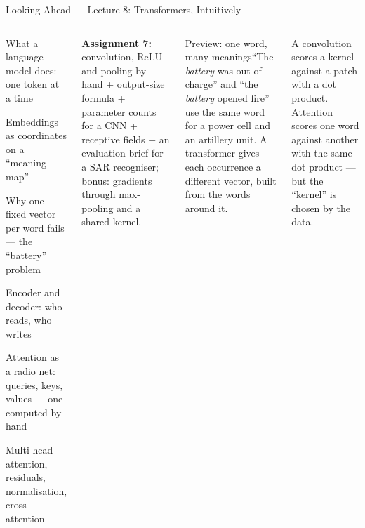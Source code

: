 \documentclass[aspectratio=169,10pt]{beamer}
\begin{document}
\begin{frame}{Looking Ahead --- Lecture 8: Transformers, Intuitively}
\begin{columns}[T]
\begin{tl}\item What a language model does: one token at a time\item Embeddings as coordinates on a ``meaning map''\item Why one fixed vector per word fails --- the ``battery'' problem\item Encoder and decoder: who reads, who writes\item Attention as a radio net: queries, keys, values --- one computed by hand\item Multi-head attention, residuals, normalisation, cross-attention\end{tl}
\begin{ibox}\scriptsize\textbf{Assignment 7:} convolution, ReLU and pooling by hand + output-size formula + parameter counts for a CNN + receptive fields + an evaluation brief for a SAR recogniser; bonus: gradients through max-pooling and a shared kernel.\end{ibox}
\begin{cbox}{Preview: one word, many meanings}\scriptsize ``The \emph{battery} was out of charge'' and ``the \emph{battery} opened fire'' use the same word for a power cell and an artillery unit. A transformer gives each occurrence a different vector, built from the words around it.\end{cbox}
\begin{rbox}\scriptsize A convolution scores a kernel against a patch with a dot product. Attention scores one word against another with the same dot product --- but the ``kernel'' is chosen by the data.\end{rbox}
\end{columns}
\end{frame}
\end{document}
